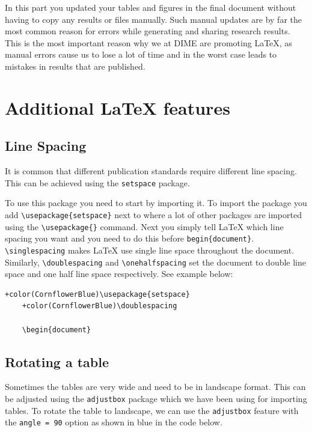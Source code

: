 \documentclass[12pts]{article}
\begin{document}
	In this part you updated your tables and figures in the final document without having to copy any results or files manually. Such manual updates are by far the most common reason for errors while generating and sharing research results. This is the most important reason why we at DIME are promoting {\LaTeX}, as manual errors cause us to lose a lot of time and in the worst case leads to mistakes in results that are published.
	
	\section{Additional {\LaTeX} features}
	
	\subsection{Line Spacing}
	It is common that different publication standards require different line spacing. This can be achieved using the \texttt{setspace} package. 
	
	To use this package you need to start by importing it. To import the package you add \verb|\usepackage{setspace}| next to where a lot of other packages are imported using the  \verb|\usepackage{}| command. Next you simply tell {\LaTeX} which line spacing you want and you need to do this before \verb|begin{document}|. \verb|\singlespacing| makes {\LaTeX} use single line space throughout the document. Similarly, \verb|\doublespacing| and \verb|\onehalfspacing| set the document to double line space and one half line space respectively. See example below:
	
	\begin{Verbatim}[commandchars=+\(\)]
	+color(CornflowerBlue)\usepackage{setspace}
	+color(CornflowerBlue)\doublespacing
	
	\begin{document}
	\end{Verbatim}
	
	\subsection{Rotating a table}
	
	Sometimes the tables are very wide and need to be in landscape format. This can be adjusted using the \texttt{adjustbox} package which we have been using for importing tables. To rotate the table to landscape, we can use the \texttt{adjustbox} feature with the \texttt{angle = 90} option as shown in blue in the code below.
	
\end{document}
